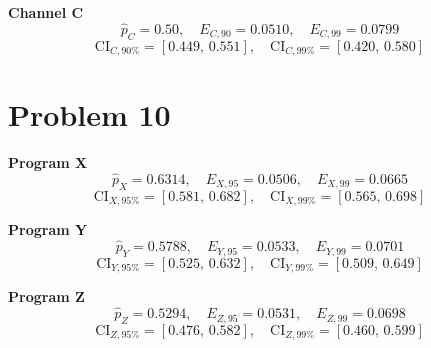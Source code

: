 	\textbf{Channel C}
	\[
	\hat p_C=0.50,\quad E_{C,90}=0.0510,\quad E_{C,99}=0.0799
	\]
	\[
	\text{CI}_{C,90\%}=[0.449,\,0.551],\quad \text{CI}_{C,99\%}=[0.420,\,0.580]
	\]
	
	\section*{Problem 10}
	\textbf{Program X}
	\[
	\hat p_X=0.6314,\quad E_{X,95}=0.0506,\quad E_{X,99}=0.0665
	\]
	\[
	\text{CI}_{X,95\%}=[0.581,\,0.682],\quad \text{CI}_{X,99\%}=[0.565,\,0.698]
	\]
	
	\textbf{Program Y}
	\[
	\hat p_Y=0.5788,\quad E_{Y,95}=0.0533,\quad E_{Y,99}=0.0701
	\]
	\[
	\text{CI}_{Y,95\%}=[0.525,\,0.632],\quad \text{CI}_{Y,99\%}=[0.509,\,0.649]
	\]
	
	\textbf{Program Z}
	\[
	\hat p_Z=0.5294,\quad E_{Z,95}=0.0531,\quad E_{Z,99}=0.0698
	\]
	\[
	\text{CI}_{Z,95\%}=[0.476,\,0.582],\quad \text{CI}_{Z,99\%}=[0.460,\,0.599]
	\]
	
